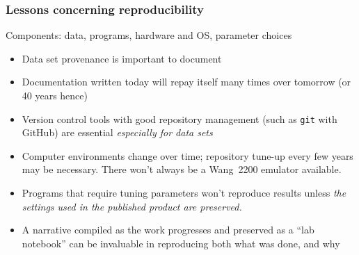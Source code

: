 \begin{frame}
	\frametitle{Lessons concerning reproducibility}
	
	Components: {\color{ForestGreen}data, programs, hardware and OS, parameter choices}
	\bigskip
	
	\begin{itemize}
		\item Data set provenance is important to document
		\item Documentation written today will repay itself many times over tomorrow (or 40 years hence)
		\item Version control tools with good repository management (such as \texttt{git} with GitHub) are essential \textit{especially for data sets}
		\item Computer environments change over time; repository tune-up every few years may be necessary.  There won't always be a Wang~2200 emulator available.
		\item Programs that require tuning parameters won't reproduce results unless \textit{the settings used in the published product are preserved.}
		\item A narrative compiled as the work progresses and preserved as a ``lab notebook'' can be invaluable in reproducing both what was done, and why
	\end{itemize}
	
\end{frame}